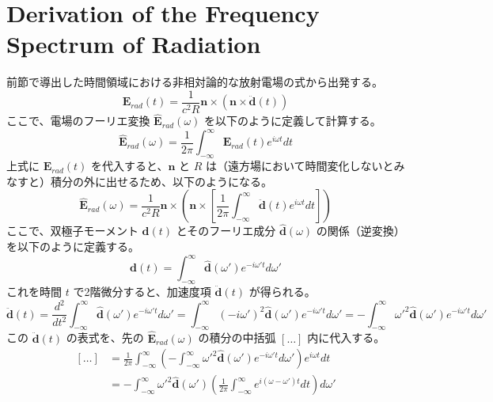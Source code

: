\documentclass[a4paper,11pt]{bxjsarticle} %
\begin{document}
\section{Derivation of the Frequency Spectrum of Radiation}

前節で導出した時間領域における非相対論的な放射電場の式から出発する。
\begin{equation}
    \mathbf{E}_{rad}(t) = \frac{1}{c^2 R} \mathbf{n} \times (\mathbf{n} \times \ddot{\mathbf{d}}(t))
\end{equation}
ここで、電場のフーリエ変換 $\hat{\mathbf{E}}_{rad}(\omega)$ を以下のように定義して計算する。
\begin{equation}
    \hat{\mathbf{E}}_{rad}(\omega) = \frac{1}{2\pi} \int_{-\infty}^{\infty} \mathbf{E}_{rad}(t) e^{i\omega t} dt
\end{equation}
上式に $\mathbf{E}_{rad}(t)$ を代入すると、$\mathbf{n}$ と $R$ は（遠方場において時間変化しないとみなすと）積分の外に出せるため、以下のようになる。
\begin{equation}
    \hat{\mathbf{E}}_{rad}(\omega) = \frac{1}{c^2 R} \mathbf{n} \times \left( \mathbf{n} \times \left[ \frac{1}{2\pi} \int_{-\infty}^{\infty} \ddot{\mathbf{d}}(t) e^{i\omega t} dt \right] \right)
\end{equation}
ここで、双極子モーメント $\mathbf{d}(t)$ とそのフーリエ成分 $\hat{\mathbf{d}}(\omega)$ の関係（逆変換）を以下のように定義する。
\begin{equation}
    \mathbf{d}(t) = \int_{-\infty}^{\infty} \hat{\mathbf{d}}(\omega') e^{-i\omega' t} d\omega'
\end{equation}
これを時間 $t$ で2階微分すると、加速度項 $\ddot{\mathbf{d}}(t)$ が得られる。
\begin{equation}
    \ddot{\mathbf{d}}(t) = \frac{d^2}{dt^2} \int_{-\infty}^{\infty} \hat{\mathbf{d}}(\omega') e^{-i\omega' t} d\omega' = \int_{-\infty}^{\infty} (-i\omega')^2 \hat{\mathbf{d}}(\omega') e^{-i\omega' t} d\omega' = - \int_{-\infty}^{\infty} \omega'^2 \hat{\mathbf{d}}(\omega') e^{-i\omega' t} d\omega'
\end{equation}
この $\ddot{\mathbf{d}}(t)$ の表式を、先の $\hat{\mathbf{E}}_{rad}(\omega)$ の積分の中括弧 $[\dots]$ 内に代入する。
\begin{align}
    \left[ \dots \right] &= \frac{1}{2\pi} \int_{-\infty}^{\infty} \left( - \int_{-\infty}^{\infty} \omega'^2 \hat{\mathbf{d}}(\omega') e^{-i\omega' t} d\omega' \right) e^{i\omega t} dt \\
    &= - \int_{-\infty}^{\infty} \omega'^2 \hat{\mathbf{d}}(\omega') \left( \frac{1}{2\pi} \int_{-\infty}^{\infty} e^{i(\omega - \omega')t} dt \right) d\omega'
\end{align}
\end{document}
